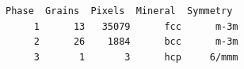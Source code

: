 \documentclass[compress]{beamer}
\begin{document}
\begin{frame}[fragile]
\begin{columns}
\begin{column}{0.67\textwidth}
\begin{overlayarea}{\textwidth}{\textheight}
\begin{onlyenv}
\begin{lstlisting}[style=output]
 Phase  Grains  Pixels  Mineral  Symmetry
     1      13   35079      fcc      m-3m
     2      26    1884      bcc      m-3m
     3       1       3      hcp     6/mmm
           \end{lstlisting}
        \end{onlyenv}

      \end{overlayarea}
    \end{column}
    \begin{column}{0.35\textwidth}
      \vspace{-0.5cm}

\end{column}
\end{columns}
\end{frame}
\end{document}

